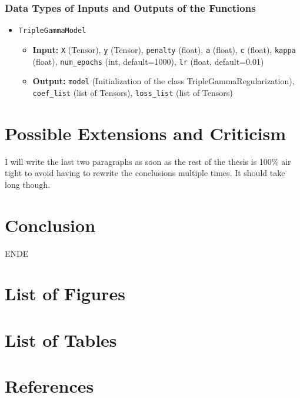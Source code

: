 \documentclass[12pt,a4paper]{article}
\newenvironment{lightbluebox}{%
    \begin{tcolorbox}[colback=lightblue, colframe=lightblue, fontupper=\itshape]%
}{%
    \end{tcolorbox}%
}
\begin{document}
\subsubsection*{Data Types of Inputs and Outputs of the Functions}
\begin{itemize}
  	\item \texttt{TripleGammaModel}
    \begin{itemize}
        \item \textbf{Input:} \texttt{X} (Tensor), \texttt{y} (Tensor), \texttt{penalty} (float), \texttt{a} (float), \texttt{c} (float), \texttt{kappa} (float), \texttt{num\_epochs} (int, default=1000), \texttt{lr} (float, default=0.01)
        \item \textbf{Output:} \texttt{model} (Initialization of the class TripleGammaRegularization), \texttt{coef\_list} (list of Tensors), \texttt{loss\_list} (list of Tensors)
    \end{itemize}
\end{itemize}

\section{Possible Extensions and Criticism}\label{sec:crit}

\begin{lightbluebox}
I will write the last two paragraphs as soon as the rest of the thesis is 100\% air tight to avoid having to rewrite the conclusions multiple times. It should take long though.
\end{lightbluebox}
\section{Conclusion}
\begin{lightbluebox}
ENDE
\end{lightbluebox}
\newpage
\section{List of Figures}
\listoffigures

\newpage
\section{List of Tables}
\listoftables

\newpage
\section{References}

\setcounter{page}{\thesavepage}
\pagestyle{plain}
%
%
\printbibliography[]
\clearpage
\end{document}
